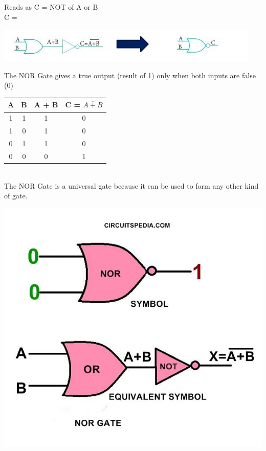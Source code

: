 \documentclass{article}
\begin{document}
Reads as C = NOT of A or B \\ 

C = \begin{center}
	\includegraphics{13}
\end{center}

The NOR Gate gives a true output (result of 1) only when both inputs are false (0) \\
\begin{table}[h!]
	\begin{center}
		\begin{tabular}{c|c|c|c}
			\textbf{A} & \textbf{B} &
			\textbf{A + B} & \textbf{C = $\overline{A + B}$}\\
			\hline
			\cellcolor{blue!20}1 & \cellcolor{blue!20}1 & \cellcolor{blue!20}1 & \cellcolor{blue!20}0 \\
			\hline
			\cellcolor{blue!30}1 & \cellcolor{blue!30}0 & \cellcolor{blue!30}1 & \cellcolor{blue!30}0 \\
			\hline
			\cellcolor{blue!20}0 & \cellcolor{blue!20}1 & \cellcolor{blue!20}1 & \cellcolor{blue!20}0\\
			\hline
			\cellcolor{blue!30}0 & \cellcolor{blue!30}0 & \cellcolor{blue!30}0 & \cellcolor{blue!30}1\\
			\hline
		\end{tabular}
	\end{center}
\end{table} \\


The NOR Gate is a universal gate because it can be used to form any other kind of gate. \\ 
\begin{center}
	\includegraphics{15}
\end{center}
\end{document}
